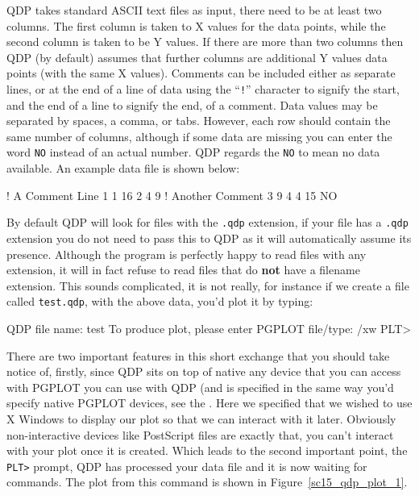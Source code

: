 \documentclass[twoside,11pt]{starlink}
\begin{document}
QDP takes standard ASCII text files as input, there need to be at
least two columns. The first column is taken to X values for the data
points, while the second column is taken to be Y values. If there are
more than two columns then QDP (by default) assumes that further
columns are additional Y values data points (with the same X values).
Comments can be included either as separate lines, or at the end of a
line of data using the ``\texttt{!}'' character to signify the start, and
the end of a line to signify the end, of a comment. Data values may be
separated by spaces, a comma, or tabs. However, each row should
contain the same number of columns, although if some data are missing
you can enter the word \texttt{NO} instead of an actual number. QDP
regards the \texttt{NO} to mean no data available. An example data file
is shown below:

\begin{small}
\begin{terminalv}
! A Comment Line
   1   1  16
   2   4   9 ! Another Comment
   3   9   4
   4  15   NO
\end{terminalv}
\end{small}

By default QDP will look for files with the \texttt{.qdp} extension, if
your file has a \texttt{.qdp} extension you do not need to pass this to
QDP as it will automatically assume its presence. Although the program
is perfectly happy to read files with any extension, it will in fact
refuse to read files that do \textbf{not} have a filename extension. This
sounds complicated, it is not really, for instance if we create a file
called \texttt{test.qdp}, with the above data, you'd plot it by typing:

\begin{small}
\begin{terminalv}
QDP file name: test
 To produce plot, please enter
PGPLOT file/type: /xw
PLT>
\end{terminalv}
\end{small}

There are two important features in this short exchange that you
should take notice of, firstly, since QDP sits on top of native
 any device that you can access with
PGPLOT you can use with QDP (and is specified in the same way you'd
specify native PGPLOT devices, see the . Here we
specified that we wished to use X Windows to display our plot so that
we can interact with it later. Obviously non-interactive devices like
PostScript files are exactly that, you can't interact with your plot
once it is created. Which leads to the second important point, the
\texttt{PLT>} prompt, QDP has processed your data file and it is now
waiting for commands. The plot from this command is shown in
Figure~\ref{sc15_qdp_plot_1}.
\end{document}

